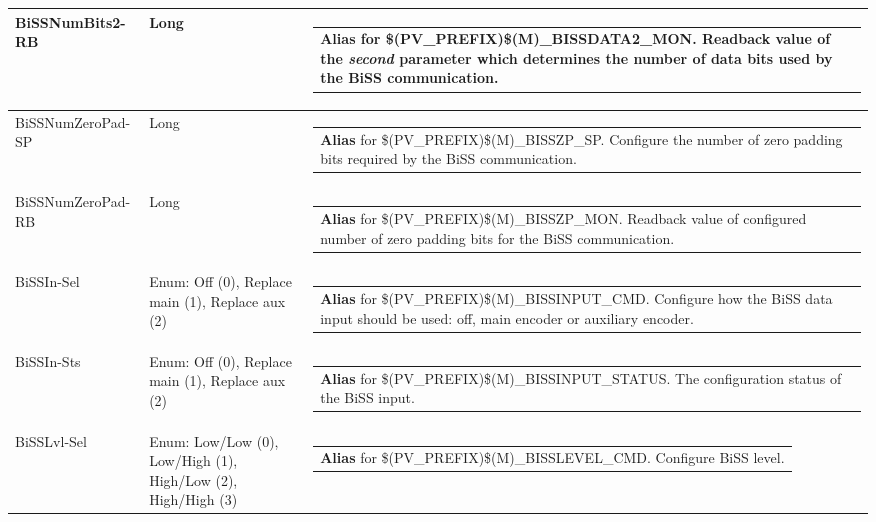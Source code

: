 \documentclass[openany]{article}
\begin{document}
\begin{longtable}{| m{4.5cm} m{2.5cm}  m{8.5cm} |}
        BiSSNumBits2-RB & Long & \begin{tabular}{@{}m{6cm}@{}}
                \textbf{\color{blue} Alias} for \$(PV\_PREFIX)\$(M)\_BISSDATA2\_MON. Readback value of the \emph{second} parameter which determines the number of data bits used by the BiSS communication.
            \end{tabular} \hypertarget{pv:biss-num-zero-pad}{}\\ \hline
        BiSSNumZeroPad-SP & Long & \begin{tabular}{@{}m{6cm}@{}}
                \textbf{\color{blue} Alias} for \$(PV\_PREFIX)\$(M)\_BISSZP\_SP. Configure the number of zero padding bits required by the BiSS communication.
            \end{tabular} \hypertarget{}{}\\ \hline
        BiSSNumZeroPad-RB & Long & \begin{tabular}{@{}m{6cm}@{}}
                \textbf{\color{blue} Alias} for \$(PV\_PREFIX)\$(M)\_BISSZP\_MON. Readback value of configured number of zero padding bits for the BiSS communication.
            \end{tabular} \hypertarget{pv:biss-in}{}\\ \hline
        BiSSIn-Sel & Enum: Off (0), Replace main (1), Replace aux (2) & \begin{tabular}{@{}m{6cm}@{}}
                \textbf{\color{blue} Alias} for \$(PV\_PREFIX)\$(M)\_BISSINPUT\_CMD. Configure how the BiSS data input should be used: off, main encoder or auxiliary encoder.
            \end{tabular} \hypertarget{}{}\\ \hline
        BiSSIn-Sts & Enum: Off (0), Replace main (1), Replace aux (2) & \begin{tabular}{@{}m{6cm}@{}}
                \textbf{\color{blue} Alias} for \$(PV\_PREFIX)\$(M)\_BISSINPUT\_STATUS. The configuration status of the BiSS input.
            \end{tabular} \hypertarget{pv:biss-lvl}{}\\ \hline
        BiSSLvl-Sel & Enum: Low/Low (0), Low/High (1), High/Low (2), High/High (3) & \begin{tabular}{@{}m{6cm}@{}}
                \textbf{\color{blue} Alias} for \$(PV\_PREFIX)\$(M)\_BISSLEVEL\_CMD. Configure BiSS level.
            \end{tabular} \hypertarget{}{}\\ \hline

\end{longtable}
\end{document}
